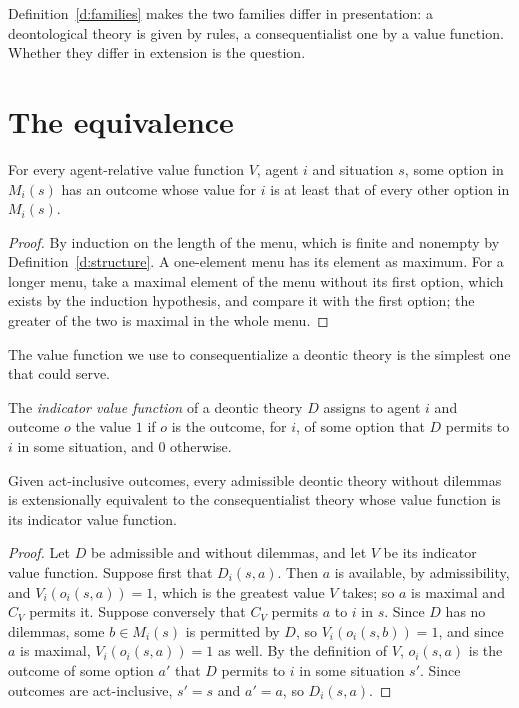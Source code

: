 \documentclass{situationist-preprint}
\begin{document}
Definition~\ref{d:families} makes the two families differ in presentation: a deontological theory is given by rules, a consequentialist one by a value function. Whether they differ in extension is the question.

\section{The equivalence}\label{s:equivalence}

\begin{lemma}\label{l:max}
For every agent-relative value function $V$, agent $i$ and situation $s$, some option in $M_i(s)$ has an outcome whose value for $i$ is at least that of every other option in $M_i(s)$.
\end{lemma}

\begin{proof}
By induction on the length of the menu, which is finite and nonempty by Definition~\ref{d:structure}. A one-element menu has its element as maximum. For a longer menu, take a maximal element of the menu without its first option, which exists by the induction hypothesis, and compare it with the first option; the greater of the two is maximal in the whole menu.
\end{proof}

The value function we use to consequentialize a deontic theory is the simplest one that could serve.

\begin{definition}\label{d:indicator}
The \emph{indicator value function} of a deontic theory $D$ assigns to agent $i$ and outcome $o$ the value $1$ if $o$ is the outcome, for $i$, of some option that $D$ permits to $i$ in some situation, and $0$ otherwise.
\end{definition}

\begin{theorem}\label{t:cons}
Given act-inclusive outcomes, every admissible deontic theory without dilemmas is extensionally equivalent to the consequentialist theory whose value function is its indicator value function.
\end{theorem}

\begin{proof}
Let $D$ be admissible and without dilemmas, and let $V$ be its indicator value function. Suppose first that $D_i(s,a)$. Then $a$ is available, by admissibility, and $V_i(o_i(s,a)) = 1$, which is the greatest value $V$ takes; so $a$ is maximal and $C_V$ permits it. Suppose conversely that $C_V$ permits $a$ to $i$ in $s$. Since $D$ has no dilemmas, some $b \in M_i(s)$ is permitted by $D$, so $V_i(o_i(s,b)) = 1$, and since $a$ is maximal, $V_i(o_i(s,a)) = 1$ as well. By the definition of $V$, $o_i(s,a)$ is the outcome of some option $a'$ that $D$ permits to $i$ in some situation $s'$. Since outcomes are act-inclusive, $s' = s$ and $a' = a$, so $D_i(s,a)$.
\end{proof}
\end{document}
